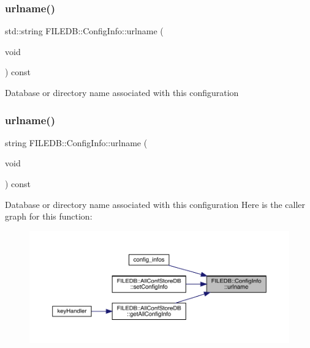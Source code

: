 \subsubsection{\texorpdfstring{urlname()}{urlname()}\hspace{0.1cm}{\footnotesize\ttfamily [2/6]}}
{\footnotesize\ttfamily std\+::string F\+I\+L\+E\+D\+B\+::\+Config\+Info\+::urlname (\begin{DoxyParamCaption}\item[{void}]{ }\end{DoxyParamCaption}) const}

Database or directory name associated with this configuration \mbox{\label{classFILEDB_1_1ConfigInfo_a2ed44f5e85fa1b69bb30fcad8cf71fa3}} 
\subsubsection{\texorpdfstring{urlname()}{urlname()}\hspace{0.1cm}{\footnotesize\ttfamily [3/6]}}
{\footnotesize\ttfamily string F\+I\+L\+E\+D\+B\+::\+Config\+Info\+::urlname (\begin{DoxyParamCaption}\item[{void}]{ }\end{DoxyParamCaption}) const}

Database or directory name associated with this configuration Here is the caller graph for this function\+:
\nopagebreak
\begin{figure}[H]
\begin{center}
\leavevmode
\includegraphics[width=350pt]{d0/d90/classFILEDB_1_1ConfigInfo_a2ed44f5e85fa1b69bb30fcad8cf71fa3_icgraph}
\end{center}
\end{figure}
\mbox{\label{classFILEDB_1_1ConfigInfo_a49750ae80347780d48415cb7aac9a068}} 
